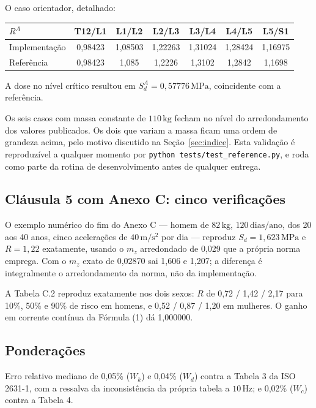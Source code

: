 \documentclass[11pt,a4paper]{article}
\newcommand{\code}[1]{\texttt{\small #1}}
\newcommand{\unit}[2]{\ensuremath{#1\,\mathrm{#2}}}
\begin{document}
O caso orientador, detalhado:

\begin{center}
\begin{tabular}{lcccccc}
\toprule
$R^A$ & T12/L1 & L1/L2 & L2/L3 & L3/L4 & L4/L5 & L5/S1 \\
\midrule
Implementação & 0,98423 & 1,08503 & 1,22263 & 1,31024 & 1,28424 & 1,16975 \\
Referência    & 0,98423 & 1,085   & 1,2226  & 1,3102  & 1,2842  & 1,1698  \\
\bottomrule
\end{tabular}
\end{center}

\noindent
A dose no nível crítico resultou em $S_d^A = \unit{0{,}57776}{MPa}$, coincidente
com a referência.

Os seis casos com massa constante de \unit{110}{kg} fecham no nível do
arredondamento dos valores publicados. Os dois que variam a massa ficam uma
ordem de grandeza acima, pelo motivo discutido na Seção~\ref{sec:indice}. Esta
validação é reproduzível a qualquer momento por \code{python
tests/test\_reference.py}, e roda como parte da rotina de desenvolvimento antes
de qualquer entrega.

\subsection{Cláusula 5 com Anexo C: cinco verificações}

O exemplo numérico do fim do Anexo C --- homem de \unit{82}{kg},
\unit{120}{dias/ano}, dos 20 aos 40 anos, cinco acelerações de \unit{40}{m/s^2}
por dia --- reproduz $S_d = \unit{1{,}623}{MPa}$ e $R = 1{,}22$ exatamente,
usando o $m_z$ arredondado de 0,029 que a própria norma emprega. Com o $m_z$
exato de 0,02870 sai 1,606 e 1,207; a diferença é integralmente o arredondamento
da norma, não da implementação.

A Tabela C.2 reproduz exatamente nos dois sexos: $R$ de 0,72 / 1,42 / 2,17 para
10\%, 50\% e 90\% de risco em homens, e 0,52 / 0,87 / 1,20 em mulheres. O ganho
em corrente contínua da Fórmula (1) dá 1,000000.

\subsection{Ponderações}

Erro relativo mediano de 0,05\% ($W_k$) e 0,04\% ($W_d$) contra a Tabela 3 da
ISO 2631-1, com a ressalva da inconsistência da própria tabela a
\unit{10}{Hz}; e 0,02\% ($W_c$) contra a Tabela 4.
\end{document}
